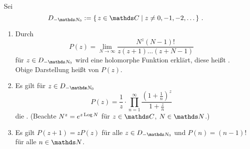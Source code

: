 \begin{satz}\label{satz:gamma-fkt}
Sei
\[
	D_{-\NN_0}
	:= \Set{z\in\CC \mid z\not= 0, -1, -2, \ldots}
	\,.
\]
\begin{enumerate}
\item Durch
\[
	P(z)
	= \lim _ {N\to\infty} \frac{N^z(N-1)!}{z(z+1)\ldots(z+N-1)}
\]
für $z\in D_{-\NN_0}$ wird eine holomorphe Funktion erklärt, diese heißt . Obige Darstellung heißt  von $P(z)$.

\item Es gilt für $z\in D_{-\NN_0}$
\[
	P(z) = \frac{1}{z} \cdot \prod_{n=1}^\infty \frac{\left(1+\frac{1}{n}\right)^z}{1+\frac{z}{n}}
\]
die .
(Beachte $N^z = e^{z\operatorname{Log} N}$ für $z\in\CC$, $N \in \NN$.)
\item Es gilt $P(z+1) = zP(z)$ für alle $z\in D_{-\NN_0}$ und $P(n) = (n-1)!$ für alle $n\in\NN$.
\end{enumerate}
\end{satz}

